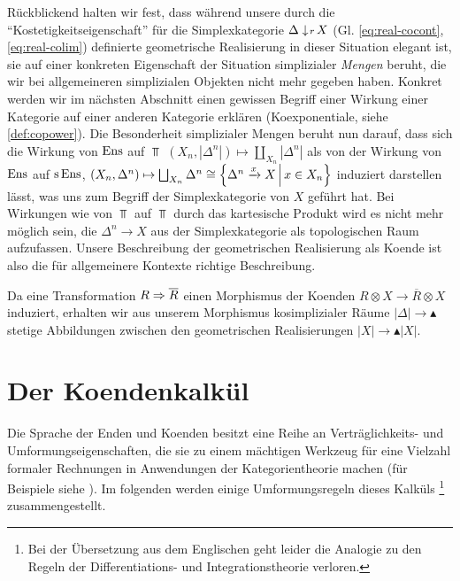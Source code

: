 \begin{bem} \label{coend-correct-real}
  Rückblickend halten wir fest, dass während unsere durch die
  ``Kostetigkeitseigenschaft'' für die Simplexkategorie
  $\Delta \downarrow \! {\scriptstyle r} \, X$ (Gl. \ref{eq:real-cocont},
  \ref{eq:real-colim}) definierte geometrische Realisierung in dieser
  Situation elegant ist, sie auf einer konkreten Eigenschaft der
  Situation simplizialer \emph{Mengen} beruht, die wir bei
  allgemeineren simplizialen Objekten nicht mehr gegeben
  haben. Konkret werden wir im nächsten Abschnitt einen gewissen
  Begriff einer Wirkung einer Kategorie auf einer anderen Kategorie
  erklären (Koexponentiale, siehe \ref{def:copower}). Die Besonderheit
  simplizialer Mengen beruht nun darauf, dass sich die Wirkung von
  $\operatorname{Ens}$ auf $\Top$ $(X_n, |\Delta^n|) \mapsto \coprod_{X_n}
  |\Delta^n|$ als von der Wirkung von $\operatorname{Ens}$ auf $\operatorname{s}\operatorname{Ens}$, $(X_n,
  \Delta^n) \mapsto \bigsqcup_{X_n} \Delta^n \cong \left\{ \Delta^n
    \xrightarrow{x} X \,\middle|\, x \in X_n \right\}$ induziert darstellen lässt, was uns
  zum Begriff der Simplexkategorie von $X$ geführt hat. Bei Wirkungen
  wie von $\Top$ auf $\Top$ durch das kartesische Produkt wird es
  nicht mehr möglich sein, die $\Delta^n \to X$ aus der
  Simplexkategorie als topologischen Raum aufzufassen. Unsere
  Beschreibung der geometrischen Realisierung als Koende ist also die
  für allgemeinere Kontexte richtige Beschreibung.
\end{bem}
\begin{bem} \label{real-model-natural}
  Da eine Transformation $R \Rightarrow \overline{R}$ einen Morphismus der
  Koenden $R \otimes X \to \overline{R} \otimes X$ induziert, erhalten
  wir aus unserem Morphismus kosimplizialer Räume $|\Delta| \to
  \blacktriangle$ stetige Abbildungen zwischen den geometrischen
  Realisierungen $|X| \to \blacktriangle |X|$.
\end{bem}

\section{Der Koendenkalkül}
\label{sec:coend-calc}

Die Sprache der Enden und Koenden besitzt eine Reihe an
Verträglichkeits- und Umformungseigenschaften, die sie zu einem
mächtigen Werkzeug für eine Vielzahl formaler Rechnungen in
Anwendungen der Kategorientheorie machen (für Beispiele siehe
\cite{Lore}). Im folgenden werden einige Umformungsregeln dieses
Kalküls \footnote{Bei der Übersetzung aus dem Englischen geht leider
  die Analogie zu den Regeln der Differentiations- und
  Integrationstheorie verloren.}  zusammengestellt.

